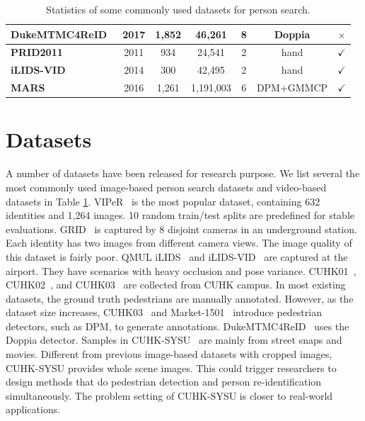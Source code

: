 \begin{table}
\begin{adjustbox}{max width=1\textwidth}
\begin{tabular}{lcccccc}
\textbf{DukeMTMC4ReID}~\cite{zheng2017unlabeled} & 2017      & 1,852     &46,261         &8          & Doppia    & $\times$ \\ 
\hline
\textbf{PRID2011}~\cite{hirzer2011person} 	    & 2011      &934        &24,541         &2          & hand      & $\checkmark$ \\ 
\textbf{iLIDS-VID}~\cite{wang2014person} 	    & 2014      &300        &42,495         &2          & hand      & $\checkmark$ \\ 
\textbf{MARS}~\cite{zheng2016mars} 	        & 2016      &1,261      &1,191,003      &6          & DPM+GMMCP & $\checkmark$ \\ 
\hline
\end{tabular}
\end{adjustbox}
\caption{Statistics of some commonly used datasets for person search.}
\label{tab:dataset}
\end{table}

\section{Datasets}
\label{ps:dataset}
A number of datasets have been released for research purpose. We list several the most commonly used image-based person search datasets and video-based datasets in Table \ref{tab:dataset}. VIPeR~\cite{gray2007evaluating} is the most popular dataset, containing 632 identities and 1,264 images. 10 random train/test splits are predefined for stable evaluations.
GRID~\cite{loy2009multi} is captured by 8 disjoint cameras in an underground station. Each identity has two images from different camera views. The image quality of this dataset is fairly poor.
QMUL iLIDS~\cite{zheng2009associating} and iLIDS-VID~\cite{wang2014person} are captured at the airport. They have scenarios with heavy occlusion and pose variance.
CUHK01~\cite{li2012human}, CUHK02~\cite{li2013locally}, and CUHK03~\cite{li2014deepreid} are collected from CUHK campus. In most existing datasets, the ground truth pedestrians are manually annotated. However, as the dataset size increases, CUHK03~\cite{li2014deepreid} and Market-1501~\cite{zheng2015scalable} introduce pedestrian detectors, such as DPM, to generate annotations. DukeMTMC4ReID~\cite{zheng2017unlabeled} uses the Doppia detector.
Samples in CUHK-SYSU~\cite{xiaoli2017joint} are mainly from street snaps and movies. Different from previous image-based datasets with cropped images, CUHK-SYSU provides whole scene images. This could trigger researchers to design methods that do pedestrian detection and person re-identification simultaneously. The problem setting of CUHK-SYSU is closer to real-world applications. 

